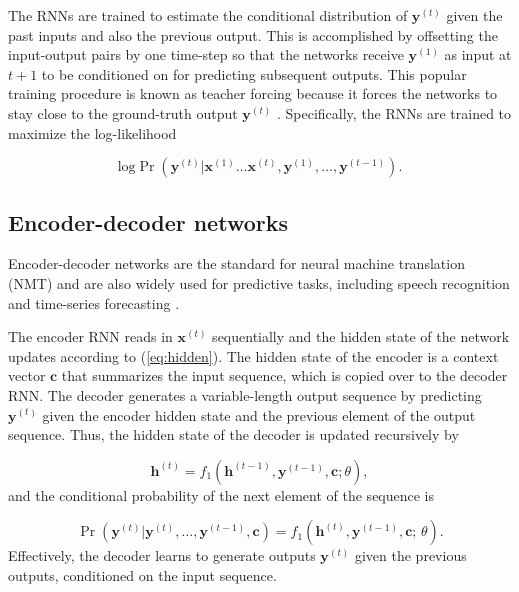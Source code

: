 The RNNs are trained to estimate the conditional distribution of $\boldsymbol{y}^{(t)}$ given the past inputs and also the previous output. This is accomplished by offsetting the input-output pairs by one time-step so that the networks receive $\boldsymbol{y}^{(1)}$  as input at $t + 1$ to be conditioned on for predicting subsequent outputs. This popular training procedure is known as teacher forcing because it forces the networks to stay close to the ground-truth output $\boldsymbol{y}^{(t)}$ \citep{lamb2016professor}. Specifically, the RNNs are trained to maximize the log-likelihood

\begin{equation} \label{rnn-obj}
	\text{log} \Pr \left(\boldsymbol{y}^{(t)} | \boldsymbol{x}^{(1)} \ldots \boldsymbol{x}^{(t)},\boldsymbol{y}^{(1)}, \ldots, \boldsymbol{y}^{(t-1)} \right).
\end{equation}

\subsection{Encoder-decoder networks}

Encoder-decoder networks are the standard for neural machine translation (NMT) \citep{cho2014learning,bahdanau2014neural,vinyals2014grammar} and are also widely used for predictive tasks, including speech recognition \citep{chorowski2015attention} and time-series forecasting \citep{zhu2017deep}. 

The encoder RNN reads in $\boldsymbol{x}^{(t)}$ sequentially and the hidden state of the network updates according to (\ref{eq:hidden}). The hidden state of the encoder is a context vector $\boldsymbol{c}$ that summarizes the input sequence, which is copied over to the decoder RNN. The decoder generates a variable-length output sequence by predicting $\boldsymbol{y}^{(t)}$ given the encoder hidden state and the previous element of the output sequence. Thus, the hidden state of the decoder is updated recursively by

\begin{equation}
	\boldsymbol{h}^{(t)} = f_1 \left( \boldsymbol{h}^{(t-1)}, \boldsymbol{y}^{(t-1)}, \boldsymbol{c}; \theta \right), \label{eq:decoder}
\end{equation} and the conditional probability of the next element of the sequence is 

\begin{equation}
	\Pr (\boldsymbol{y}^{(t)} | \boldsymbol{y}^{(t)}, \ldots, \boldsymbol{y}^{(t-1)}, \boldsymbol{c}) =  f_1 \left( \boldsymbol{h}^{(t)}, \boldsymbol{y}^{(t-1)}, \boldsymbol{c}; \, \theta \right).
\end{equation}  Effectively, the decoder learns to generate outputs $\boldsymbol{y}^{(t)}$ given the previous outputs, conditioned on the input sequence. 


